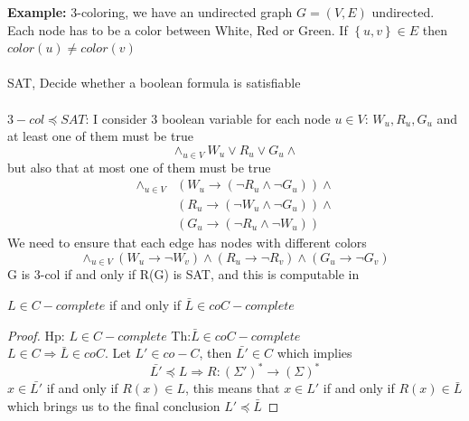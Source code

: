 \textbf{Example:}
3-coloring, we have an undirected graph $G=(V,E)$ undirected. Each node has to be a color between White, Red or Green. If $\left\{ u,v \right\} \in E$ then $color(u) \neq color(v)$\\\\
SAT, Decide whether a boolean formula is satisfiable\\\\
$3-col \preceq SAT$: I consider 3 boolean variable for each node $u \in V$: $W_u, R_u, G_u$ and at least one of them must be true
\[ 
    \wedge_{u \in V}{W_u \vee R_u \vee G_u} \wedge 
\]but also that at most one of them must be true
\begin{align*}
    \wedge_{u \in V}&(W_u \rightarrow (\neg R_u \wedge \neg G_u)) \wedge \\ 
    & (R_u \rightarrow (\neg W_u \wedge \neg G_u)) \wedge \\ 
    & (G_u \rightarrow (\neg R_u \wedge \neg W_u))
\end{align*}
We need to ensure that each edge has nodes with different colors
\[ 
    \wedge_{u \in V}{(W_u \rightarrow \neg W_v) \wedge(R_u \rightarrow \neg R_v) \wedge(G_u \rightarrow \neg G_v)}
\]
G is 3-col if and only if R(G) is SAT, and this is computable in
\begin{lemma}
    $L \in C-complete$ if and only if $\bar{L} \in coC-complete$
    \begin{proof}
        Hp: $L \in C-complete$ Th:$\bar{L} \in coC-complete$\\
        $ L \in C \Rightarrow \bar{L} \in coC $. Let $L' \in co-C$, then $\bar{L'} \in C$ which implies
        \[ 
            \bar{L'} \preceq L \Rightarrow R:(\Sigma')^* \rightarrow (\Sigma)^* 
        \]$x \in \bar{L'}$ if and only if $R(x) \in L$, this means that $x \in L'$ if and only if $R(x) \in \bar{L}$ which brings us to the final conclusion $L' \preceq \bar{L}$
    \end{proof}
\end{lemma}
